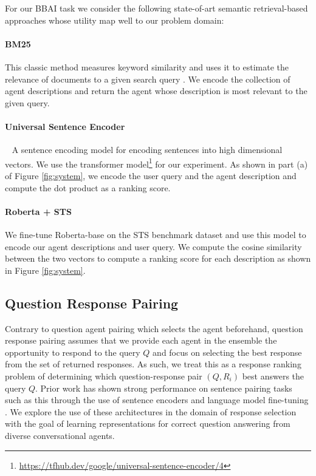 \documentclass[11pt]{article}
\begin{document}
For our BBAI task we consider the following state-of-art semantic retrieval-based approaches whose utility map well to our problem domain:

\paragraph{BM25} This classic method measures keyword similarity and uses it to estimate the relevance of documents to a given search query \cite{10.1561/1500000019}. We encode the collection of agent descriptions and return the agent whose description is most relevant to the given query.

\paragraph{Universal Sentence Encoder} ~\cite{cer-etal-2018-universal} A sentence encoding model for encoding sentences into high dimensional vectors. We use the transformer model\footnote{\url{https://tfhub.dev/google/universal-sentence-encoder/4}} for our experiment. As shown in part (a) of Figure \ref{fig:system}, we encode the user query and the agent description and compute the dot product as a ranking score.

\paragraph{Roberta + STS} \cite{reimers-2019-sentence-bert} We fine-tune Roberta-base on the STS benchmark dataset and use this model to encode our agent descriptions and user query. We compute the cosine similarity between the two vectors to compute a ranking score for each description as shown in Figure \ref{fig:system}.



\subsection{Question Response Pairing}
Contrary to question agent pairing which selects the agent beforehand, question response pairing assumes that we provide each agent in the ensemble the opportunity to respond to the query $Q$ and focus on selecting the best response from the set of returned responses. As such, we treat this as a response ranking problem of determining which question-response pair $(Q, R_{i})$ best answers the query $Q$. Prior work has shown strong performance on sentence pairing tasks such as this through the use of sentence encoders and language model fine-tuning \cite{henderson2019convert, Humeau2020Poly-encoders:, reimers-2019-sentence-bert}. We explore the use of these architectures in the domain of response selection with the goal of learning representations for correct question answering from diverse conversational agents.
\end{document}
